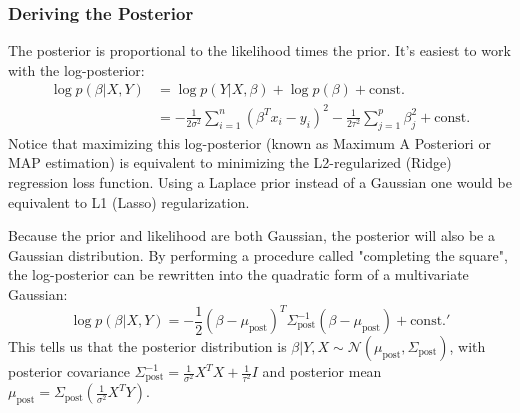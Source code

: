 \documentclass{article}
\begin{document}
\begin{multicols}{2}
\subsubsection{Deriving the Posterior}
The posterior is proportional to the likelihood times the prior. It's easiest to work with the log-posterior:
\begin{align*}
\log p(\beta|X, Y) &= \log p(Y|X, \beta) + \log p(\beta) + \text{const.} \\
&= -\frac{1}{2\sigma^2} \sum_{i=1}^{n} (\beta^T x_i - y_i)^2 - \frac{1}{2\tau^2} \sum_{j=1}^{p} \beta_j^2 + \text{const.}
\end{align*}
Notice that maximizing this log-posterior (known as Maximum A Posteriori or MAP estimation) is equivalent to minimizing the L2-regularized (Ridge) regression loss function. Using a Laplace prior instead of a Gaussian one would be equivalent to L1 (Lasso) regularization.

Because the prior and likelihood are both Gaussian, the posterior will also be a Gaussian distribution. By performing a procedure called "completing the square", the log-posterior can be rewritten into the quadratic form of a multivariate Gaussian:
$$ \log p(\beta|X,Y) = -\frac{1}{2}(\beta - \mu_{\text{post}})^T \Sigma_{\text{post}}^{-1}(\beta - \mu_{\text{post}}) + \text{const.}' $$
This tells us that the posterior distribution is $\beta|Y, X \sim \mathcal{N}(\mu_{\text{post}}, \Sigma_{\text{post}})$, with posterior covariance $\Sigma_{\text{post}}^{-1} = \frac{1}{\sigma^2}X^T X + \frac{1}{\tau^2}I$ and posterior mean $\mu_{\text{post}} = \Sigma_{\text{post}}\left(\frac{1}{\sigma^2}X^T Y\right)$.


\end{multicols}
\end{document}
